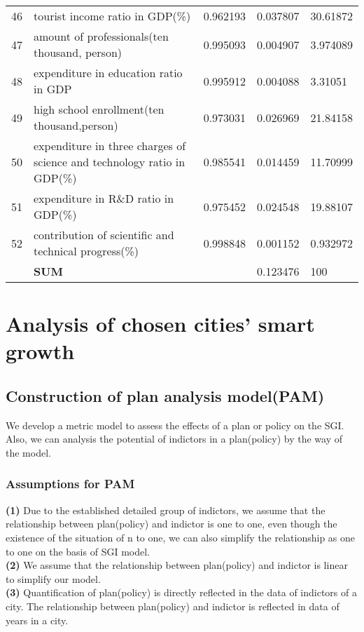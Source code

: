 \documentclass{mcmthesis}
\begin{document}
\begin{table}
\begin{tabular}{p{0.4cm}|p{8cm}|p{1.5cm}|p{1.5cm}|p{1.7cm}}
46		& tourist income ratio in GDP(\%)		& 0.962193		& 0.037807		& 30.61872 \\	
47		& amount of professionals(ten thousand, person)		& 0.995093		& 0.004907		& 3.974089 \\	
48		& expenditure in education ratio in GDP		& 0.995912		& 0.004088		& 3.31051 \\	
49		& high school enrollment(ten thousand,person)		& 0.973031		& 0.026969		& 21.84158 \\	
50		& expenditure in three charges of science and technology ratio in GDP(\%)		& 0.985541		& 0.014459		& 11.70999 \\	
51		& expenditure in R\&D ratio in GDP(\%)		& 0.975452		& 0.024548		& 19.88107 \\	
52		& contribution of scientific and technical progress(\%)		& 0.998848		& 0.001152		& 0.932972 \\	
	&\bf  SUM			& 		& 0.123476		& 100 \\	
\hline
\hline
\end{tabular}
\end{table}



\newpage

\section{Analysis of chosen cities' smart growth}
\subsection{Construction of plan analysis model(PAM)}%
We develop a metric model to assess the effects of a plan or policy on the SGI. Also, we can analysis the potential of indictors in a plan(policy) by the way of the model. \\
\subsubsection{Assumptions  for PAM}%
{\bf (1) } Due to the established detailed group of indictors, we assume that the relationship between plan(policy) and indictor is one to one, even though the existence of the situation of n to one, we can also simplify the relationship as one to one on the basis of SGI model.\\
{\bf (2) } We assume that the relationship between plan(policy) and indictor is linear to simplify our model.\\
{\bf (3) }Quantification of plan(policy) is directly reflected in the data of indictors of a city.
The relationship between plan(policy) and indictor is reflected in data of years in a city.\\
\end{document}
